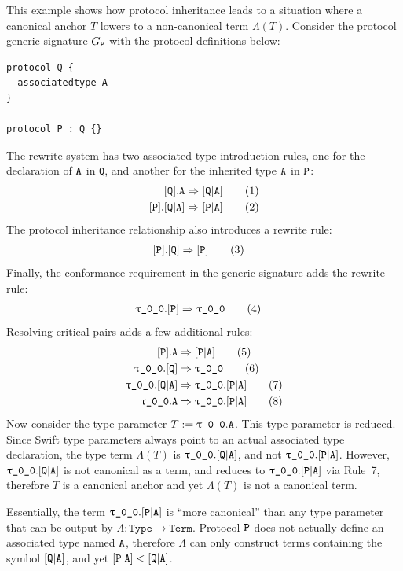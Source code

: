 \documentclass[../generics]{subfiles}
\begin{document}
\begin{example} This example shows how protocol inheritance leads to a situation where a canonical anchor $T$ lowers to a non-canonical term $\Lambda(T)$. Consider the protocol generic signature $G_{\texttt{P}}$ with the protocol definitions below:
\begin{Verbatim}
protocol Q {
  associatedtype A
}

protocol P : Q {}
\end{Verbatim}
The rewrite system has two associated type introduction rules, one for the declaration of $\texttt{A}$ in \texttt{Q}, and another for the inherited type $\texttt{A}$ in $\texttt{P}$:
\begin{align}
\pQ.\nA&\Rightarrow\assocsym{Q}{A}\tag{1}\\
\pP.\assocsym{Q}{A}&\Rightarrow \assocsym{P}{A}\tag{2}
\end{align}
The protocol inheritance relationship also introduces a rewrite rule:
\begin{align}
[\texttt{P}].[\texttt{Q}]&\Rightarrow[\texttt{P}]\tag{3}
\end{align}
Finally, the conformance requirement in the generic signature adds the rewrite rule:
\begin{align}
\rT.\pP&\Rightarrow\rT\tag{4}
\end{align}
Resolving critical pairs adds a few additional rules:
\begin{align}
\pP.\nA&\Rightarrow\assocsym{P}{A}\tag{5}\\
\rT.\pQ&\Rightarrow\rT\tag{6}\\
\rT.\assocsym{Q}{A}&\Rightarrow\rT.\assocsym{P}{A}\tag{7}\\
\rT.\nA&\Rightarrow\rT.\assocsym{P}{A}\tag{8}
\end{align}
Now consider the type parameter $T:=\rT.\nA$. This type parameter is reduced. Since Swift type parameters always point to an actual associated type declaration, the type term $\Lambda(T)$ is $\rT.\assocsym{Q}{A}$, and not $\rT.\assocsym{P}{A}$. However, $\rT.\assocsym{Q}{A}$ is not canonical as a term, and reduces to $\rT.\assocsym{P}{A}$ via Rule~7, therefore $T$ is a canonical anchor and yet $\Lambda(T)$ is not a canonical term.

Essentially, the term $\rT.\assocsym{P}{A}$ is ``more canonical'' than any type parameter that can be output by $\Lambda:\texttt{Type}\rightarrow\texttt{Term}$. Protocol $\texttt{P}$ does not actually define an associated type named $\texttt{A}$, therefore $\Lambda$ can only construct terms containing the symbol $[\texttt{Q}|\texttt{A}]$, and yet $[\texttt{P}|\texttt{A}]<[\texttt{Q}|\texttt{A}]$.


\end{example}
\end{document}
